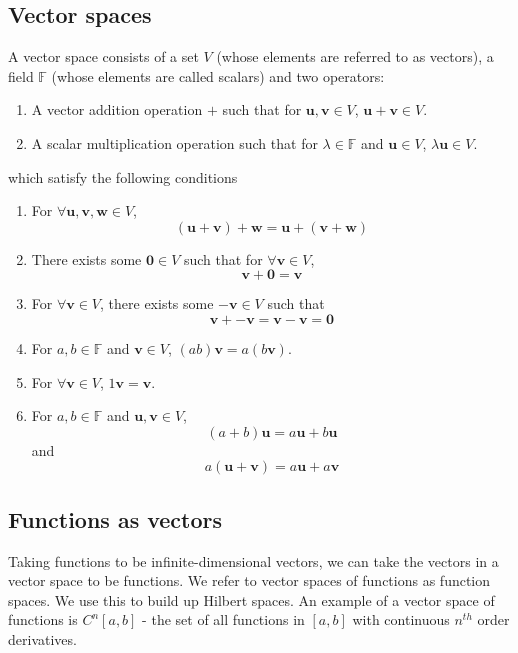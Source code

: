 \documentclass[]{article}
\begin{document}
\subsection{Vector spaces}
A vector space consists of a set $V$ (whose elements are referred to as vectors), a field $\mathbb{F}$ (whose elements are called scalars) and two operators:
\begin{enumerate}
	\item A vector addition operation $+$ such that for $\textbf{u},\textbf{v} \in V$, $\textbf{u} + \textbf{v} \in V$.
	\item A scalar multiplication operation such that for $\lambda \in \mathbb{F}$ and $\textbf{u} \in V$, $\lambda \textbf{u} \in V$.
\end{enumerate}
which satisfy the following conditions
\begin{enumerate}
	\item For $\forall \textbf{u},\textbf{v},\textbf{w} \in V$, 
	\begin{equation} (\textbf{u} + \textbf{v}) + \textbf{w} = \textbf{u} + (\textbf{v} + \textbf{w}) \end{equation}
	\item There exists some $\textbf{0} \in V$ such that for $\forall \textbf{v} \in V$, \begin{equation}\textbf{v} + \textbf{0} = \textbf{v}\end{equation}
	\item For $\forall \textbf{v} \in V$, there exists some $-\textbf{v} \in V$ such that \begin{equation}\textbf{v}+-\textbf{v} = \textbf{v}-\textbf{v}=\textbf{0}\end{equation}
	\item For $a,b \in \mathbb{F}$ and $\textbf{v} \in V$, $(ab)\mathbf{v} = a(b\mathbf{v})$.
	\item For $\forall \textbf{v} \in V$, $1\textbf{v} = \textbf{v}$.
	\item For $a,b \in \mathbb{F}$ and $\textbf{u}, \textbf{v} \in V$, \begin{equation} (a + b)\textbf{u} = a\textbf{u} + b\textbf{u} \end{equation}
	and
	\begin{equation} a(\textbf{u} + \textbf{v}) = a\textbf{u} + a\textbf{v}
	\end{equation}
\end{enumerate}
\subsection{Functions as vectors}
Taking functions to be infinite-dimensional vectors, we can take the vectors in a vector space to be functions. We refer to vector spaces of functions as function spaces. We use this to build up Hilbert spaces. An example of a vector space of functions is $C^{n}[a,b]$ - the set of all functions in $[a,b]$ with continuous $n^{th}$ order derivatives.
\end{document}
